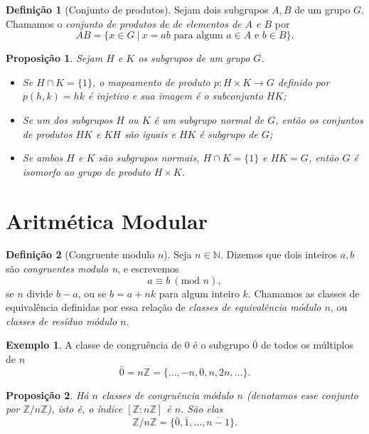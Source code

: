 \documentclass[a4paper,12pt]{report}
\theoremstyle{plain}
\newtheorem{proposicao}{Proposição}[section]
\theoremstyle{definition}
\newtheorem{definicao}{Definição}[section]
\newtheorem{exemplo}{Exemplo}[section]
\begin{document}
\begin{definicao}[Conjunto de produtos]
	Sejam dois subgrupos \(A,B\) de um grupo \(G\).
	Chamamos o \emph{conjunto de produtos de de elementos de \(A\) e \(B\)} por
	\[AB = \{x\in G \ | \ x = ab \text{ para algum }a\in A\text{ e }b\in B\}.\]
\end{definicao}

\begin{proposicao}
	Sejam \(H\) e \(K\) os subgrupos de um grupo \(G\).
	\begin{itemize}
		\item Se \(H\cap K = \{1\}\), o mapeamento de produto
		\(p: H\times K\longrightarrow G\) definido por \(p(h,k) = hk\) é
		injetivo e sua imagem é o subconjunto \(HK\);
		\item Se um dos subgrupos
		\(H\) ou \(K\) é um subgrupo normal de \(G\), então os conjuntos de
		produtos \(HK\) e \(KH\) são iguais e \(HK\) é subgrupo de \(G\);
		\item Se ambos \(H\) e \(K\) são subgrupos normais, \(H\cap K = \{1\}\) e
		\(HK = G\), então \(G\) é isomorfo ao grupo de produto \(H\times K\).
	\end{itemize}
\end{proposicao}

\section{Aritmética Modular}

\begin{definicao}[Congruente modulo $n$]
	Seja \(n\in\mathbb{N}\). Dizemos que dois inteiros
	\(a,b\) são \emph{congruentes modulo n}, e escrevemos
	\[ a \equiv b \ (\text{mod }n),\]
	se \(n\) divide \(b-a\), ou se \(b = a + nk\) para algum inteiro \(k\).
	Chamamos as classes de equivalência definidas por essa relação de
	\emph{classes de equivalência módulo \(n\)}, ou \emph{classes de resíduo módulo \(n\)}.	
\end{definicao}

\begin{exemplo}
	A classe de congruência de 0 é o subgrupo \(\bar{0}\)
	de todos os múltiplos de \(n\) \[\bar{0} = n\mathbb{Z} = \{\dots,-n,0,n,2n, \dots\}.\]
\end{exemplo}

\begin{proposicao}
	Há \(n\) classes de congruência módulo \(n\) (denotamos esse conjunto por \(\mathbb{Z}/n\mathbb{Z}\)), isto é, o índice \([\mathbb{Z}:n\mathbb{Z}]\) é \(n\). São elas \[\mathbb{Z}/n\mathbb{Z} =  \{\bar{0}, \bar{1},\dots,\overline{n - 1}\}.\]		
\end{proposicao}
\end{document}
